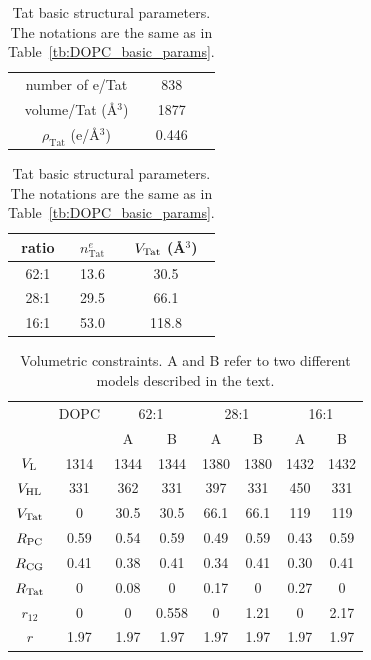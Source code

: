 \begin{table}[htbp]
  \centering
  \begin{tabular}{ ccc }
    \hline
    number of e/Tat & 838 \\ 
    volume/Tat (\AA$^3$) & 1877 \\
    $\rho_\textrm{Tat}$ (e/\AA$^3$) & 0.446 \\
    \hline
  \end{tabular}
  \quad
  \begin{tabular}{ ccc }
    \hline
    ratio & $n^e_\textrm{Tat}$ & $V_\textrm{Tat}$ (\AA$^3$) \\    
    \hline
    62:1 & 13.6 & 30.5 \\
    28:1 & 29.5 & 66.1 \\
    16:1 & 53.0 & 118.8 \\
    \hline
  \end{tabular}
  \caption{Tat basic structural parameters. The notations are the same
  as in Table~\ref{tb:DOPC_basic_params}.}
  \label{tb:Tat_basic_params}
\end{table}
\begin{table}[htbp]
  \centering
  \begin{tabular}{ |c|c|c|c|c|c|c|c| }
    \hline
     & DOPC & \multicolumn{2}{c|}{62:1} & \multicolumn{2}{c|}{28:1} & \multicolumn{2}{c|}{16:1} \\
    \cline{3-8}
     & & A & B & A & B & A & B \\
    \hline
    $V_\textrm{L}$ & 1314 & 1344 & 1344 & 1380 & 1380 & 1432 & 1432 \\    
    $V_\textrm{HL}$ & 331 & 362 & 331 & 397 & 331 & 450 & 331 \\  
    $V_\textrm{Tat}$ & 0 & 30.5 & 30.5 & 66.1 & 66.1 & 119 & 119 \\  
    $R_\textrm{PC}$ & 0.59 & 0.54 & 0.59 & 0.49 & 0.59 & 0.43 & 0.59 \\
    $R_\textrm{CG}$ & 0.41 & 0.38 & 0.41 & 0.34 & 0.41 & 0.30 & 0.41 \\
    $R_\textrm{Tat}$ & 0   & 0.08 & 0    & 0.17 & 0    & 0.27 & 0 \\ 
    $r_{12}$ & 0 & 0 & 0.558 & 0 & 1.21 & 0 & 2.17 \\
    $r$ & 1.97 & 1.97 & 1.97 & 1.97 & 1.97 & 1.97 & 1.97 \\ 
    \hline
  \end{tabular}
  \caption{Volumetric constraints. A and B refer to two different models 
  described in the text.}
  \label{tb:model_constraints}
\end{table}


